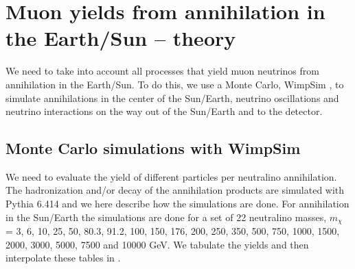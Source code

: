 \section{Muon yields from annihilation in the Earth/Sun -- theory}

We need to take into account all processes that yield muon neutrinos from
annihilation in the Earth/Sun. To do this, we use a Monte Carlo, WimpSim \cite{wimpsim}, to simulate
annihilations in the center of the Sun/Earth, neutrino oscillations and neutrino interactions on the way out of the Sun/Earth and to the detector.

\subsection{Monte Carlo simulations with WimpSim}
\label{sec:nt-mcsim}

We need to
evaluate the yield of different particles per neutralino annihilation.
The hadronization and/or decay of the annihilation products are
simulated with {\sc Pythia} \cite{pythia} 6.414
and we here describe how the simulations are done.
For annihilation in the Sun/Earth 
the simulations are done for a set of 22 neutralino
masses, $m_{\chi}$ = 3, 6, 10, 25, 50, 80.3, 91.2, 100, 150, 176, 200, 250,
350, 500, 750, 1000, 1500, 2000, 3000, 5000, 7500 and 10000 GeV\@.
We tabulate the yields and then interpolate these tables in \ds.

